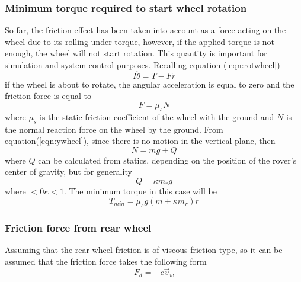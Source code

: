 \documentclass{article}
\begin{document}
	\subsubsection{Minimum torque required to start wheel rotation}
	So far, the friction effect has been taken into account as a force acting on the wheel due to its rolling under torque, however, if the applied torque is not enough, the wheel will not start rotation. This quantity is important for simulation and system control purposes. Recalling equation (\ref{eqn:rotwheel})
	\[I\ddot{\theta} = T - Fr
	\]
	if the wheel is about to rotate, the angular acceleration is equal to zero and the friction force is equal to 
	\[
	F = \mu_sN
	\]
	where $\mu_s$ is the static friction coefficient of the wheel with the ground and $N$ is the normal reaction force on the wheel by the ground. From equation(\ref{eqn:ywheel}), since there is no motion in the vertical plane, then 
	\begin{equation}
	N = mg + Q
	\end{equation}
	where $Q$ can be calculated from statics, depending on the position of  the rover's center of gravity, but for generality 
	\[Q = \kappa m_r g
	\]
	where $<0\kappa<1$. The minimum torque in this case will be
	\begin{equation}
	T_{min} = \mu_sg\left(m+\kappa m_r\right)r
	\end{equation}
	 \subsubsection{Friction force from rear wheel}
	 Assuming that the rear wheel friction is of viscous friction type, so it can be assumed that the friction force takes the following form 
	 \begin{equation}
	 F_d = -c\vec{v}_w
	 \label{eqn:friction}
	 \end{equation}
	 
\end{document}
